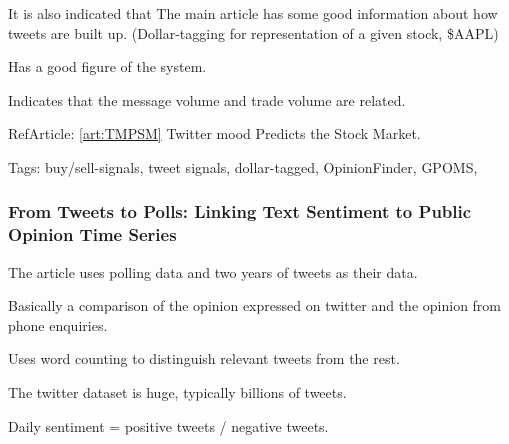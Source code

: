 It is also indicated that The main article has some good information about how
tweets are built up. (Dollar-tagging for representation of a given stock,
\$AAPL)

Has a good figure of the system. 

Indicates that the message volume and trade volume are related. 

RefArticle: \ref{art:TMPSM} Twitter mood Predicts the Stock Market.

Tags: buy/sell-signals, tweet signals, dollar-tagged, OpinionFinder, GPOMS, 

\subsubsection{From Tweets to Polls: Linking Text Sentiment to Public Opinion
Time
Series}

The article uses polling data and two years of tweets as their data. 

Basically a comparison of the opinion expressed on twitter and the opinion from
phone enquiries. 

Uses word counting to distinguish relevant tweets from the rest. 

The twitter dataset is huge, typically billions of tweets. 

Daily sentiment = positive tweets / negative tweets.



